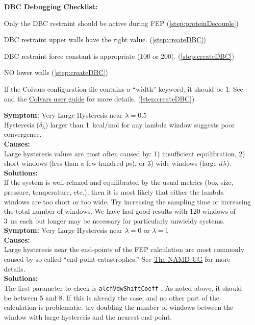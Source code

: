 \documentclass[9pt,tutorial]{Styling/livecoms}
\newcommand{\textInput}[1]{
  \texttt{#1}
}
\begin{document}
\textbf{DBC Debugging Checklist:}
\begin{todolist} \label{list:DBCdebug}
    \item Only the DBC restraint should be active during FEP (\ref{step:proteinDecouple})
    \item DBC restraint upper walls have the right value. (\ref{step:createDBC})
    \item DBC restraint force constant is appropriate (100 or 200). (\ref{step:createDBC})
    \item NO lower walls (\ref{step:createDBC})
    \item If the Colvars configuration file contains a ``width'' keyword, it should be 1. See \cite{Fiorin2013} and the \href{http://colvars.github.io/colvars-refman-vmd/colvars-refman-vmd.html#sec:colvar_grid_params}{Colvars user guide} for more details. (\ref{step:createDBC})
\end{todolist}


\noindent\textbf{Symptom:} Very Large Hysteresis near $\lambda=0.5$\\
Hysteresis ($\delta_\lambda$) larger than 1~kcal/mol for any lambda window suggests poor convergence.\\
\textbf{Causes:}\\
Large hysteresis values are most often caused by: 1) insufficient equilibration, 2) short windows (less than a few hundred ps), or 3) wide windows (large $d\lambda$).\\
\textbf{Solutions:}\\
If the system is well-relaxed and equilibrated by the usual metrics (box size, pressure, temperature, etc.), then it is most likely that either the lambda windows are too short or too wide. Try increasing the sampling time or increasing the total number of windows. We have had good results with 120 windows of 3~ns each but longer may be necessary for particularly unwieldy systems.\\

\noindent\textbf{Symptom:}  Very Large Hysteresis near $\lambda=0$ or $\lambda=1$\\
\textbf{Causes:}\\
Large hysteresis near the end-points of the FEP calculation are most commonly caused by so-called ``end-point catastrophes.'' See \href{https://www.ks.uiuc.edu/Research/namd/2.14/ug/node63.html}{The NAMD UG} for more details. \cite{Bernardi2020}\\  
\textbf{Solutions:}\\
The first parameter to check is \textInput{alchVdwShiftCoeff}. As noted above, it should be between 5 and 8. If this is already the case, and no other part of the calculation is problematic, try doubling the number of windows between the window with large hysteresis and the nearest end-point.\\
\end{document}
